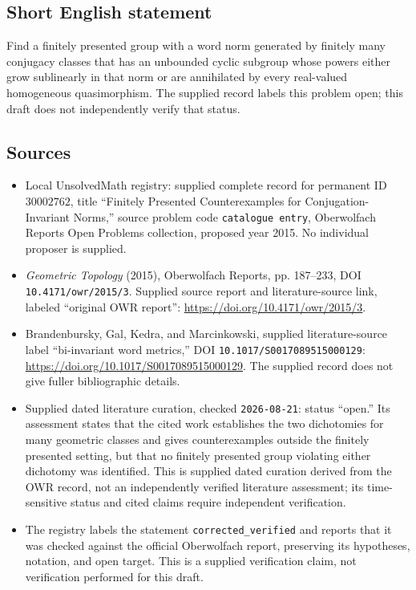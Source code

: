 \documentclass[11pt]{article}
\begin{document}
\subsection{Short English statement}
Find a finitely presented group with a word norm generated by finitely many conjugacy classes that has an unbounded cyclic subgroup whose powers either grow sublinearly in that norm or are annihilated by every real-valued homogeneous quasimorphism. The supplied record labels this problem open; this draft does not independently verify that status.
\subsection{Sources}
\begin{itemize}
\item Local UnsolvedMath registry: supplied complete record for permanent ID \(30002762\), title ``Finitely Presented Counterexamples for Conjugation-Invariant Norms,'' source problem code \texttt{catalogue entry}, Oberwolfach Reports Open Problems collection, proposed year 2015. No individual proposer is supplied.
\item \emph{Geometric Topology} (2015), Oberwolfach Reports, pp. 187--233, DOI \texttt{10.4171/owr/2015/3}. Supplied source report and literature-source link, labeled ``original OWR report'': \url{https://doi.org/10.4171/owr/2015/3}.
\item Brandenbursky, Gal, Kedra, and Marcinkowski, supplied literature-source label ``bi-invariant word metrics,'' DOI \texttt{10.1017/S0017089515000129}: \url{https://doi.org/10.1017/S0017089515000129}. The supplied record does not give fuller bibliographic details.
\item Supplied dated literature curation, checked \texttt{2026-08-21}: status ``open.'' Its assessment states that the cited work establishes the two dichotomies for many geometric classes and gives counterexamples outside the finitely presented setting, but that no finitely presented group violating either dichotomy was identified. This is supplied dated curation derived from the OWR record, not an independently verified literature assessment; its time-sensitive status and cited claims require independent verification.
\item The registry labels the statement \texttt{corrected\_verified} and reports that it was checked against the official Oberwolfach report, preserving its hypotheses, notation, and open target. This is a supplied verification claim, not verification performed for this draft.
\end{itemize}
\end{document}
